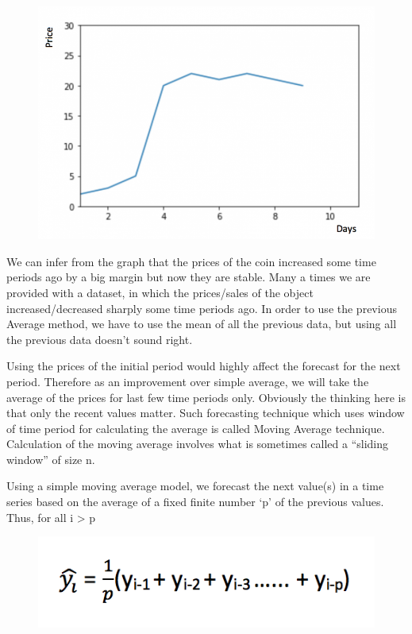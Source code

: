 \documentclass[11pt]{article}
\makeatletter
\def\maxwidth{\ifdim\Gin@nat@width>\linewidth\linewidth
    \else\Gin@nat@width\fi}
\let\Oldincludegraphics\includegraphics
\renewcommand{\includegraphics}[1]{\Oldincludegraphics[width=.8\maxwidth]{#1}}
\makeatother
\begin{document}
\begin{figure}
\centering
\includegraphics{image5.png}
\caption{}
\end{figure}

We can infer from the graph that the prices of the coin increased some
time periods ago by a big margin but now they are stable. Many a times
we are provided with a dataset, in which the prices/sales of the object
increased/decreased sharply some time periods ago. In order to use the
previous Average method, we have to use the mean of all the previous
data, but using all the previous data doesn't sound right.

Using the prices of the initial period would highly affect the forecast
for the next period. Therefore as an improvement over simple average, we
will take the average of the prices for last few time periods only.
Obviously the thinking here is that only the recent values matter. Such
forecasting technique which uses window of time period for calculating
the average is called Moving Average technique. Calculation of the
moving average involves what is sometimes called a ``sliding window'' of
size n.

Using a simple moving average model, we forecast the next value(s) in a
time series based on the average of a fixed finite number `p' of the
previous values. Thus, for all i \textgreater{} p

\begin{figure}
\centering
\includegraphics{image6.png}
\caption{}
\end{figure}
\end{document}
